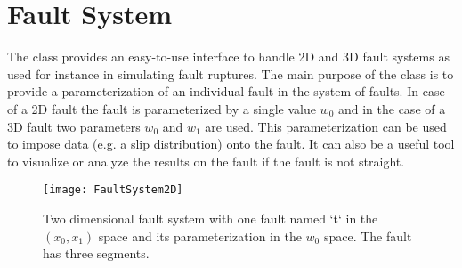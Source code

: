 
%
%
%

\section{Fault System}
\label{Fault System}
The  class provides an easy-to-use interface to handle 2D
and 3D fault systems as used for instance in simulating fault
ruptures. The main purpose of the class is to provide a parameterization of
an individual fault in the system of faults.
In case of a 2D fault the fault is parameterized by a single value $w_{0}$ and
in the case of a 3D fault two parameters $w_{0}$ and $w_{1}$ are used.
This parameterization can be used to impose data (e.g. a slip distribution)
onto the fault. It can also be a useful tool to visualize or analyze the
results on the fault if the fault is not straight. 

\begin{figure}
\centering
\texttt{[image: FaultSystem2D]}
\caption{\label{FAULTSYSTEM2D}Two dimensional fault system with one fault
named `t` in the $(x_{0},x_{1})$ space and its parameterization in the
$w_{0}$ space. The fault has three segments.}
\end{figure}

